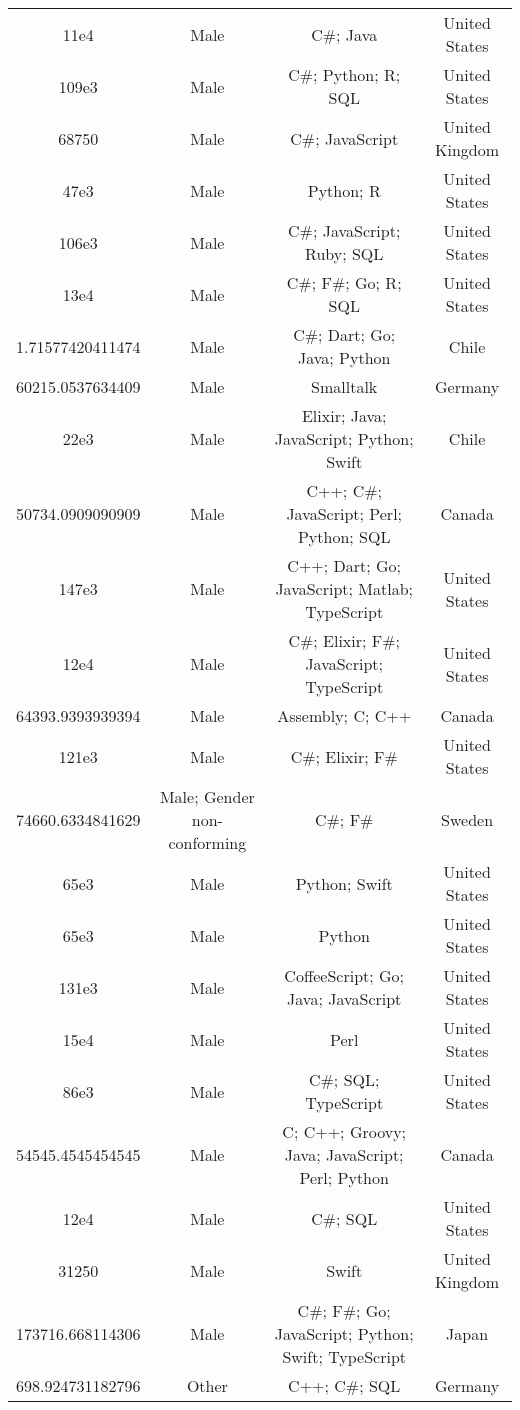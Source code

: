 \begin{center}
\begin{tabular}{ |c|c|c|c| }
11e4  &  Male  &  C\#; Java  &  United States  \\ 
109e3  &  Male  &  C\#; Python; R; SQL  &  United States  \\ 
68750  &  Male  &  C\#; JavaScript  &  United Kingdom  \\ 
47e3  &  Male  &  Python; R  &  United States  \\ 
106e3  &  Male  &  C\#; JavaScript; Ruby; SQL  &  United States  \\ 
13e4  &  Male  &  C\#; F\#; Go; R; SQL  &  United States  \\ 
1.71577420411474  &  Male  &  C\#; Dart; Go; Java; Python  &  Chile  \\ 
60215.0537634409  &  Male  &  Smalltalk  &  Germany  \\ 
22e3  &  Male  &  Elixir; Java; JavaScript; Python; Swift  &  Chile  \\ 
50734.0909090909  &  Male  &  C++; C\#; JavaScript; Perl; Python; SQL  &  Canada  \\ 
147e3  &  Male  &  C++; Dart; Go; JavaScript; Matlab; TypeScript  &  United States  \\ 
12e4  &  Male  &  C\#; Elixir; F\#; JavaScript; TypeScript  &  United States  \\ 
64393.9393939394  &  Male  &  Assembly; C; C++  &  Canada  \\ 
121e3  &  Male  &  C\#; Elixir; F\#  &  United States  \\ 
74660.6334841629  &  Male; Gender non-conforming  &  C\#; F\#  &  Sweden  \\ 
65e3  &  Male  &  Python; Swift  &  United States  \\ 
65e3  &  Male  &  Python  &  United States  \\ 
131e3  &  Male  &  CoffeeScript; Go; Java; JavaScript  &  United States  \\ 
15e4  &  Male  &  Perl  &  United States  \\ 
86e3  &  Male  &  C\#; SQL; TypeScript  &  United States  \\ 
54545.4545454545  &  Male  &  C; C++; Groovy; Java; JavaScript; Perl; Python  &  Canada  \\ 
12e4  &  Male  &  C\#; SQL  &  United States  \\ 
31250  &  Male  &  Swift  &  United Kingdom  \\ 
173716.668114306  &  Male  &  C\#; F\#; Go; JavaScript; Python; Swift; TypeScript  &  Japan  \\ 
698.924731182796  &  Other  &  C++; C\#; SQL  &  Germany  \\ 

\end{tabular}
\end{center}
